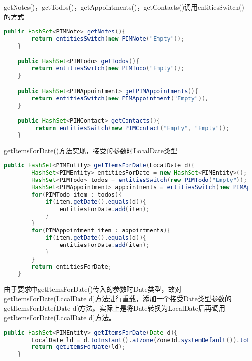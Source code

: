 \documentclass[a4paper]{article}
\begin{document}
getNotes()，getTodos()，getAppointments()，getContacts()调用entitiesSwitch()的方式

\begin{lstlisting}[language=Java]
    public HashSet<PIMNote> getNotes(){
        return entitiesSwitch(new PIMNote("Empty"));
    }

    public HashSet<PIMTodo> getTodos(){
        return entitiesSwitch(new PIMTodo("Empty"));
    }

    public HashSet<PIMAppointment> getPIMAppointments(){
        return entitiesSwitch(new PIMAppointment("Empty"));
    }

    public HashSet<PIMContact> getContacts(){
         return entitiesSwitch(new PIMContact("Empty", "Empty"));
    }
\end{lstlisting}

getItemsForDate()方法实现，接受的参数时LocalDate类型

\begin{lstlisting}[language=Java]
    public HashSet<PIMEntity> getItemsForDate(LocalDate d){
        HashSet<PIMEntity> entitiesForDate = new HashSet<PIMEntity>();
        HashSet<PIMTodo> todos = entitiesSwitch(new PIMTodo("Empty"));
        HashSet<PIMAppointment> appointments = entitiesSwitch(new PIMAppointment("Empty"));
        for(PIMTodo item : todos){
            if(item.getDate().equals(d)){
                entitiesForDate.add(item);
            }
        }
        for(PIMAppointment item : appointments){
            if(item.getDate().equals(d)){
                entitiesForDate.add(item);
            }
        }
        return entitiesForDate;
    }
\end{lstlisting}

由于要求中getItemsForDate()传入的参数时Date类型，故对getItemsForDate(LocalDate d)方法进行重载，添加一个接受Date类型参数的getItemsForDate(Date d)方法。实际上是将Date转换为LocalDate后再调用getItemsForDate(LocalDate d)方法。

\begin{lstlisting}[language=Java]
    public HashSet<PIMEntity> getItemsForDate(Date d){
        LocalDate ld = d.toInstant().atZone(ZoneId.systemDefault()).toLocalDate();
        return getItemsForDate(ld);
    }
\end{lstlisting}
\end{document}
